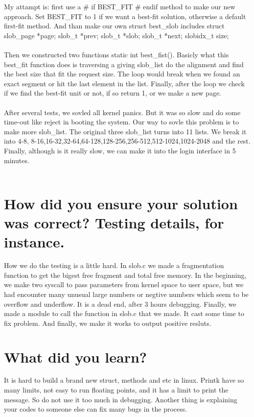 \documentclass[12pt,letterpaper]{article}
\begin{document}
\indent My attampt is: first use a \# if BEST\_FIT \# endif method to make our new approach. Set BEST\_FIT to 1 if we want a best-fit solution, otherwise a default first-fit method. And than make our own struct best\_slob includes struct slob\_page *page; slob\_t *prev; slob\_t *slob; slob\_t *next; slobidx\_t size; \\\\
\indent Then we constructed two functions static int best\_fist(). Basicly what this best\_fit function does is traversing a giving slob\_list do the alignment and find the best size that fit the request size. The loop would break when we found an exact segment or hit the last element in the list. Finally, after the loop we check if we find the best-fit unit or not, if so return 1, or we make a new page.\\\\
\indent After several tests, we sovled all kernel panics. But it was so slow and do some time-out like reject in booting the system. Our way to sovle this problem is to make more slob\_list. The original three slob\_list turns into 11 lists. We break it into 4-8, 8-16,16-32,32-64,64-128,128-256,256-512,512-1024,1024-2048 and the rest. Finally, although is it really slow, we can make it into the login interface in 5 minutes.\\\\

\section{How did you ensure your solution was correct? Testing details, for instance.}

\indent How we do the testing is a little hard. In slob.c we made a fragmentation function to get the bigest free fragment and total free memory. In the beginning, we make two syscall to pass parameters from kernel space to user space, but we had encounter many unusual large numbers or negtive numbers which seem to be overflow and underflow. It is a dead end, after 3 hours debugging. Finally, we made a module to call the function in slob.c that we made. It cast some time to fix problem. And finally, we make it works to output positive resluts.

\section{What did you learn?}

\indent It is hard to build a brand new struct, methods and etc in linux. Printk have so many limits, not easy to run floating points, and it has a limit to print the message. So do not use it too much in debugging. Another thing is explaining your codes to someone else can fix many bugs in the process.
\end{document}

